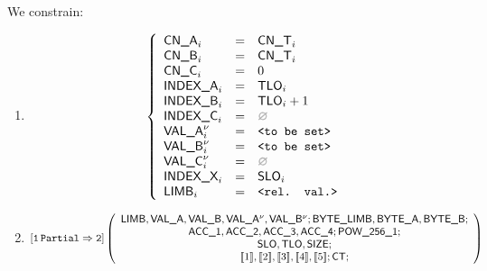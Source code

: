 \begin{center}
\end{center}

We constrain:
\begin{enumerate}
	\item 
		\[
			\left\{ \begin{array}{lclr}
				\cnA      _{i}       & = & \cnT_{i}            \\
				\cnB      _{i}       & = & \cnT_{i}            \\
				\cnC      _{i}       & = & 0                   \\
				\indexA   _{i}       & = & \tlo_{i}            \\
				\indexB   _{i}       & = & \tlo_{i} + 1        \\
				\indexC   _{i}       & = & \nothing            \\
				\valA     _{i}\new{} & = & \valueToBeSet       \\
				\valB     _{i}\new{} & = & \valueToBeSet       \\
				\valC     _{i}\new{} & = & \nothing            \\
				\indexX   _{i}       & = & \slo_{i}            \\
				\limb     _{i}       & = & \relevantValue      \\
			\end{array} \right.
		\]
	\item 
		\[
			\onePartialToTwo
			\left( \begin{array}{c}
				\limb{}, \valA{}, \valB{},
				\valA{}\new, \valB{}\new;
				\byteLimb{}, \BYTEA{}, \BYTEB{};
				\\
				\acc{1}, \acc{2}, \acc{3}, \acc{4}; \pow{1};
				\\
				\slo, \tlo, \size{};
				\\
				\bit{1}, \bit{2}, \bit{3}, \bit{4}, \bit{5}; \ct{};
			\end{array} \right)
		\]
\end{enumerate}
